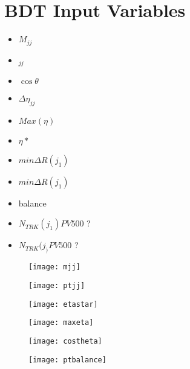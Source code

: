 \section{BDT Input Variables}

	\begin{itemize}
		\item $M_{jj}$
		\item \pt$_{jj}$
		\item $\cos \theta$
		\item $\Delta\eta_{jj}$
		\item $Max(\eta)$
		\item $\eta*$
		\item $min\Delta R(j_1)$
		\item $min\Delta R(j_1)$
		\item \pt balance
		\item $N_{TRK}(j_1) PV500$ ?
		\item $N_{TRK}(j_) PV500$ ?
	\end{itemize}
	
		\begin{figure}[h]
			\begin{minipage}[h]{0.45\linewidth}
				\texttt{[image: mjj]}
				\caption{}
				\label{fig:bdtmjj}
			\end{minipage}
			\quad
			\begin{minipage}[h]{0.45\linewidth}
				\texttt{[image: ptjj]}
				\caption{}
				\label{fig:bdtptjj}
			\end{minipage}
		\end{figure}
		
		\begin{figure}[h]
			\centering
			\begin{minipage}[h]{0.45\linewidth}
				\texttt{[image: etastar]}
				\caption{}
				\label{fig:bdtetastar}
			\end{minipage}
			\quad
			\begin{minipage}[h]{0.45\linewidth}
				\texttt{[image: maxeta]}
				\caption{}
				\label{fig:bdtmaxeta}
			\end{minipage}
		\end{figure}
		
		\begin{figure}[h]
			\centering
			\begin{minipage}[h]{0.45\linewidth}
				\texttt{[image: costheta]}
				\caption{}
				\label{fig:bdtcpostheta}
			\end{minipage}
			\quad
			\begin{minipage}[h]{0.45\linewidth}
				\texttt{[image: ptbalance]}
				\caption{}
				\label{fig:bdtptbalance}
			\end{minipage}
		\end{figure}


